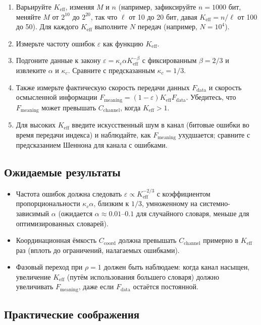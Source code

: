 \documentclass[12pt,a4paper]{article}
\theoremstyle{remark}
\newcommand{\Keff}{K_{\mathrm{eff}}}
\begin{document}
	\begin{enumerate}
		\item Варьируйте $\Keff$, изменяя $M$ и $n$ (например, зафиксируйте $n=1000$ бит, меняйте $M$ от $2^{10}$ до $2^{20}$, так что $\ell$ от 10 до 20 бит, давая $\Keff = n/\ell$ от 100 до 50). Для каждого $\Keff$ выполните $N$ передач (например, $N=10^4$).
		\item Измерьте частоту ошибок $\varepsilon$ как функцию $\Keff$.
		\item Подгоните данные к закону $\varepsilon = \kappa_c \alpha K_{\mathrm{eff}}^{-\beta}$ с фиксированным $\beta=2/3$ и извлеките $\alpha$ и $\kappa_c$. Сравните с предсказанным $\kappa_c=1/3$.
		\item Также измерьте фактическую скорость передачи данных $F_{\text{data}}$ и скорость осмысленной информации $F_{\text{meaning}} = (1-\varepsilon) \Keff F_{\text{data}}$. Убедитесь, что $F_{\text{meaning}}$ может превышать $C_{\text{channel}}$, когда $\Keff>1$.
		\item Для высоких $\Keff$ введите искусственный шум в канал (битовые ошибки во время передачи индекса) и наблюдайте, как $F_{\text{meaning}}$ ухудшается; сравните с предсказанием Шеннона для канала с ошибками.
	\end{enumerate}
	
	\subsection{Ожидаемые результаты}
	
	\begin{itemize}
		\item Частота ошибок должна следовать $\varepsilon \propto K_{\mathrm{eff}}^{-2/3}$ с коэффициентом пропорциональности $\kappa_c \alpha$, близким к $1/3$, умноженному на системно-зависимый $\alpha$ (ожидается $\alpha \approx 0.01$–$0.1$ для случайного словаря, меньше для оптимизированных словарей).
		\item Координационная ёмкость $C_{\text{coord}}$ должна превышать $C_{\text{channel}}$ примерно в $\Keff$ раз (вплоть до ограничений, налагаемых ошибками).
		\item Фазовый переход при $\rho=1$ должен быть наблюдаем: когда канал насыщен, увеличение $\Keff$ (путём использования большего словаря) должно увеличивать $F_{\text{meaning}}$, даже если $F_{\text{data}}$ остаётся постоянной.
	\end{itemize}
	
	\subsection{Практические соображения}
	
\end{document}
